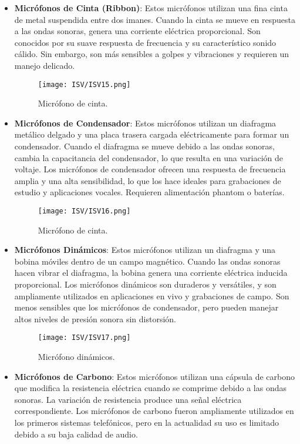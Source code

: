 \documentclass[
	12pt, %
	fleqn, %
	a4paper, %
	oneside, %
]{LegrandOrangeBook}
\begin{document}
\begin{itemize}
  \item \textbf{Micrófonos de Cinta (Ribbon)}: Estos micrófonos utilizan una fina cinta de metal suspendida entre dos imanes. Cuando la cinta se mueve en respuesta a las ondas sonoras, genera una corriente eléctrica proporcional. Son conocidos por su suave respuesta de frecuencia y su característico sonido cálido. Sin embargo, son más sensibles a golpes y vibraciones y requieren un manejo delicado.
\begin{figure}[H]
\centering
\texttt{[image: ISV/ISV15.png]}
\caption{Micrófono de cinta.}
\end{figure}
  \item \textbf{Micrófonos de Condensador}: Estos micrófonos utilizan un diafragma metálico delgado y una placa trasera cargada eléctricamente para formar un condensador. Cuando el diafragma se mueve debido a las ondas sonoras, cambia la capacitancia del condensador, lo que resulta en una variación de voltaje. Los micrófonos de condensador ofrecen una respuesta de frecuencia amplia y una alta sensibilidad, lo que los hace ideales para grabaciones de estudio y aplicaciones vocales. Requieren alimentación phantom o baterías.
\begin{figure}[H]
\centering
\texttt{[image: ISV/ISV16.png]}
\caption{Micrófono de cinta.}
\end{figure}
  \item \textbf{Micrófonos Dinámicos}: Estos micrófonos utilizan un diafragma y una bobina móviles dentro de un campo magnético. Cuando las ondas sonoras hacen vibrar el diafragma, la bobina genera una corriente eléctrica inducida proporcional. Los micrófonos dinámicos son duraderos y versátiles, y son ampliamente utilizados en aplicaciones en vivo y grabaciones de campo. Son menos sensibles que los micrófonos de condensador, pero pueden manejar altos niveles de presión sonora sin distorsión.
\begin{figure}[H]
\centering
\texttt{[image: ISV/ISV17.png]}
\caption{Micrófono dinámicos.}
\end{figure}
  \item \textbf{Micrófonos de Carbono}: Estos micrófonos utilizan una cápsula de carbono que modifica la resistencia eléctrica cuando se comprime debido a las ondas sonoras. La variación de resistencia produce una señal eléctrica correspondiente. Los micrófonos de carbono fueron ampliamente utilizados en los primeros sistemas telefónicos, pero en la actualidad su uso es limitado debido a su baja calidad de audio.

\end{itemize}
\end{document}

